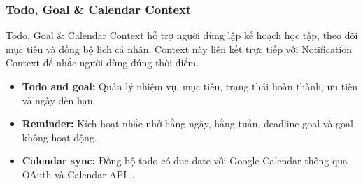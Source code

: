 \subsubsection{Todo, Goal \& Calendar Context}
\label{subsubsec:todo-calendar-context}

Todo, Goal \& Calendar Context hỗ trợ người dùng lập kế hoạch học tập, theo dõi mục tiêu và đồng bộ lịch cá nhân. Context này liên kết trực tiếp với Notification Context để nhắc người dùng đúng thời điểm.

\begin{itemize}
    \item \textbf{Todo and goal:} Quản lý nhiệm vụ, mục tiêu, trạng thái hoàn thành, ưu tiên và ngày đến hạn.
    \item \textbf{Reminder:} Kích hoạt nhắc nhở hằng ngày, hằng tuần, deadline goal và goal không hoạt động.
    \item \textbf{Calendar sync:} Đồng bộ todo có due date với Google Calendar thông qua OAuth và Calendar API~\cite{googlecalendarjava}.
\end{itemize}